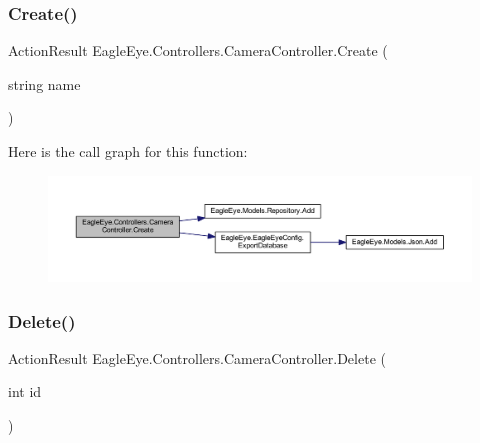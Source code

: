 \subsubsection{\texorpdfstring{Create()}{Create()}}
{\footnotesize\ttfamily Action\+Result Eagle\+Eye.\+Controllers.\+Camera\+Controller.\+Create (\begin{DoxyParamCaption}\item[{string}]{name }\end{DoxyParamCaption})}





Here is the call graph for this function\+:\nopagebreak
\begin{figure}[H]
\begin{center}
\leavevmode
\includegraphics[width=350pt]{class_eagle_eye_1_1_controllers_1_1_camera_controller_a07c68e0e159c17b1725489ddf54f9f1d_cgraph}
\end{center}
\end{figure}
\mbox{\label{class_eagle_eye_1_1_controllers_1_1_camera_controller_ade4d5c697769c79b1866f95bbf7fc889}} 
\subsubsection{\texorpdfstring{Delete()}{Delete()}}
{\footnotesize\ttfamily Action\+Result Eagle\+Eye.\+Controllers.\+Camera\+Controller.\+Delete (\begin{DoxyParamCaption}\item[{int}]{id }\end{DoxyParamCaption})}





